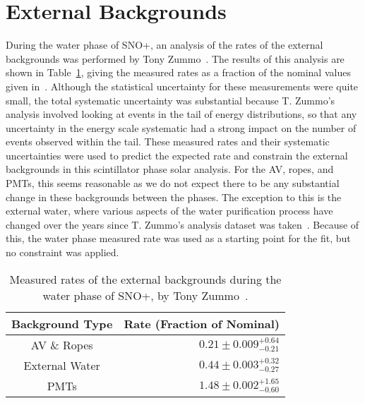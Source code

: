 \section{External Backgrounds}\label{sec:rates_ext_backgrounds}
During the water phase of SNO+, an analysis of the rates of the external backgrounds was performed by Tony Zummo~\cite{zummoExternalBackgroundBox2022}. %
The results of this analysis are shown in Table~\ref{tab:externals_rates_zummo}, giving the measured rates as a fraction of the nominal values given in~\cite{andringaCurrentStatusFuture2016}. %
Although the statistical uncertainty for these measurements were quite small, the total systematic uncertainty was substantial because T. Zummo's analysis involved looking at events in the tail of energy distributions, so that any uncertainty in the energy scale systematic had a strong impact on the number of events observed within the tail. These measured rates and their systematic uncertainties were used to predict the expected rate and constrain the external backgrounds in this scintillator phase solar analysis. For the AV, ropes, and PMTs, this seems reasonable as we do not expect there to be any substantial change in these backgrounds between the phases. The exception to this is the external water, where various aspects of the water purification process have changed over the years since T. Zummo's analysis dataset was taken~\cite{kaptanogluFirstLookExternal2023}. Because of this, the water phase measured rate was used as a starting point for the fit, but no constraint was applied.

\begin{table}
    \centering
    \begin{tabular}{c r}
        \hline
        Background Type & Rate (Fraction of Nominal)  \\ \hline \hline
        AV \& Ropes    & $0.21\pm0.009^{+0.64}_{-0.21}$  \\
        External Water & $0.44\pm0.003^{+0.32}_{-0.27}$  \\
        PMTs           & $1.48\pm0.002^{+1.65}_{-0.60}$  \\
        \hline
    \end{tabular}
    \caption[Measured rates of the external backgrounds during the water phase of SNO+, by Tony Zummo]
    {Measured rates of the external backgrounds during the water phase of SNO+, by Tony Zummo~\cite{zummoExternalBackgroundBox2022}. %
    }
    \label{tab:externals_rates_zummo}
\end{table}

